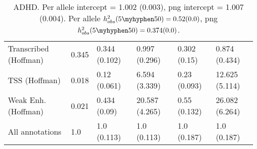 \documentclass[11pt]{article}
\begin{document}
\begin{table}[H]
\begin{center}
\begin{tabular}{l|lllll}
Transcribed (Hoffman)  &  0.345 & 0.344 (0.102) & 0.997 (0.296) &
0.302 (0.15) & 0.874 (0.434) \\
TSS (Hoffman)  &  0.018 & 0.12 (0.061) & 6.594 (3.339) &
0.23 (0.093) & 12.625 (5.114) \\
Weak Enh. (Hoffman)  &  0.021 & 0.434 (0.09) & 20.587 (4.265) &
0.55 (0.132) & 26.082 (6.264) \\
All annotations  &  1.0 & 1.0 (0.113) & 1.0 (0.113) &
1.0 (0.187) & 1.0 (0.187) \\
\end{tabular}
\caption{ADHD.
Per allele intercept = 1.002 (0.003),
png intercept = 1.007 (0.004).
Per allele $h^2_{obs}(5\myhyphen50) = 0.52 (0.0)$,
png $h^2_{obs}(5\myhyphen50) = 0.374 (0.0)$.}
\end{center}
\end{table}
\end{document}
